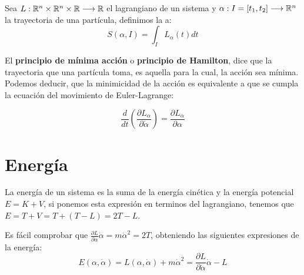 \begin{definition}
    Sea $L:\mathbb{R}^n\times\mathbb{R}^n\times\mathbb{R}\longrightarrow \mathbb{R}$ el lagrangiano de un sistema y $\alpha:I=[t_1, t_2]\longrightarrow \mathbb{R}^n$ la trayectoria de una partícula, definimos la  a:
    \begin{equation}
        \label{eq:accion}
        S(\alpha,I)=\int_{I}L_\alpha(t) dt
    \end{equation}
\end{definition}

El \textbf{principio de mínima acción} o \textbf{principio de Hamilton}, dice que la trayectoria que una partícula toma, es aquella para la cual, la acción sea mínima.
Podemos deducir, que la minimicidad de la acción es equivalente a que se cumpla la ecuación del movimiento de Euler-Lagrange:
\begin{postulate}
    \begin{equation}
        \label{eq:euler_lagrange}
        \frac{d}{dt}\left(\frac{\partial L_\alpha}{\partial \dot{\alpha}}\right)=\frac{\partial L_\alpha}{\partial \alpha}
    \end{equation}
\end{postulate}


\section{Energía}
La energía de un sistema es la suma de la energía cinética y la energía potencial $E=K+V$, si ponemos esta expresión en terminos del lagrangiano, tenemos que $E=T+V=T+(T-L)=2T-L$.

Es fácil comprobar que $\frac{\partial L}{\partial\dot{\alpha}}\dot{\alpha}=m\dot{\alpha}^2=2T$, obteniendo las siguientes expresiones de la energía:
\begin{equation}
    \label{eq:energia_lagrangiana}
    E(\alpha, \dot{\alpha})=L(\alpha, \dot{\alpha})+m\dot{\alpha}^2=\frac{\partial L}{\partial\dot{\alpha}}\dot{\alpha}-L
\end{equation}

